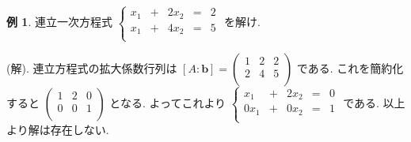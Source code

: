 \documentclass[dvipdfmx,a4paper,11pt]{article}
\theoremstyle{definition}
\newtheorem{exa}[thm]{例}
\begin{document}
\begin{exa}
連立一次方程式
 $
 \left\{ 
\begin{matrix}
x_1&+&2x_2& = &2 \\
x_1&+&4x_2& = &5\\
\end{matrix}
\right.
 $
 を解け.
 
 (解). 連立方程式の拡大係数行列は
 $[A:\bm{b}]=
  \begin{pmatrix}
 1& 2& 2  \\
 2& 4& 5  \\
 \end{pmatrix}
 $
 である. 
 これを簡約化すると
 $
  \begin{pmatrix}
 1& 2& 0  \\
 0& 0& 1 \\
 \end{pmatrix} 
 $
 となる. よってこれより
 $
  \left\{ 
\begin{matrix}
x_1&+&2x_2& = &0 \\
0x_1&+&0x_2& = &1\\
\end{matrix}
\right.
$
である. 以上より解は存在しない.
\end{exa}
\end{document}
